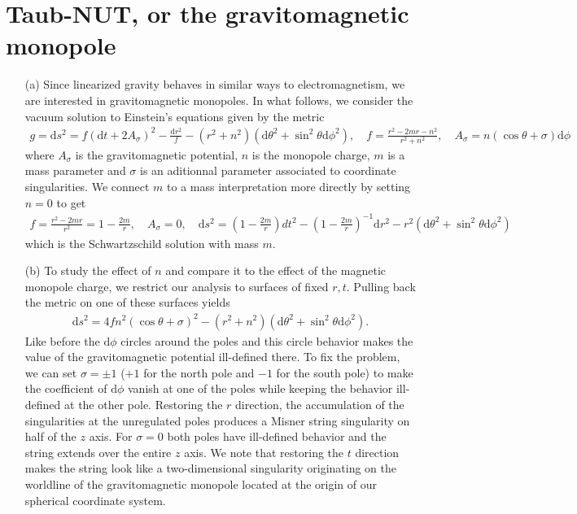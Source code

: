 \documentclass[10pt, a4paper]{article}
\begin{document}
{\section{Taub-NUT, or the gravitomagnetic monopole}
\begin{enumerate}
  \item[(a)] Since linearized gravity behaves in similar ways to electromagnetism, we are interested in gravitomagnetic monopoles. In what follows, we consider the vacuum solution to Einstein's equations given by the metric
  \begin{align*}
    g = \text{d} s^2=f\left(\text{d} t+2 A_\sigma\right)^2-\frac{\text{d} r^2}{f}-\left(r^2+n^2\right)\left(\text{d} \theta^2+\sin ^2 \theta \text{d} \phi^2\right), \quad f=\frac{r^2-2 m r-n^2}{r^2+n^2}, \quad A_\sigma=n(\cos \theta+\sigma) \text{d} \phi
  \end{align*}
  where $A_{\sigma}$ is the gravitomagnetic potential, $n$ is the monopole charge, $m$ is a mass parameter and $\sigma$ is an aditionnal parameter associated to coordinate singularities. We connect $m$ to a mass interpretation more directly by setting $n=0$ to get 
  \begin{align*}
    f=\frac{r^2-2 m r}{r^2} = 1-\frac{2m}{r}, \quad A_\sigma=0, \quad \text{d} s^2= \left(1-\frac{2m}{r}\right) d t^2-\left(1-\frac{2m}{r}\right)^{-1}\text{d} r^2 - r^2\left(\text{d} \theta^2+\sin ^2 \theta \text{d} \phi^2\right)
  \end{align*}
  which is the Schwartzschild solution with mass $m$.
  \item[(b)] To study the effect of $n$ and compare it to the effect of the magnetic monopole charge, we restrict our analysis to surfaces of fixed $r, t$. Pulling back the metric on one of these surfaces yields 
  \begin{align*}
    \text{d} s^2=4 f n^2 (\cos \theta+\sigma)^2-\left(r^2+n^2\right)\left(\text{d} \theta^2+\sin ^2 \theta \text{d} \phi^2\right).
  \end{align*}
  Like before the $\text{d}\phi$ circles around the poles and this circle behavior makes the value of the gravitomagnetic potential ill-defined there. To fix the problem, we can set $\sigma = \pm 1$ ($+1$ for the north pole and $-1$ for the south pole) to make the coefficient of $\text{d}\phi$ vanish at one of the poles while keeping the behavior ill-defined at the other pole. Restoring the $r$ direction, the accumulation of the singularities at the unregulated poles produces a Misner string singularity on half of the $z$ axis. For $\sigma = 0$ both poles have ill-defined behavior and the string extends over the entire $z$ axis. We note that restoring the $t$ direction makes the string look like a two-dimensional singularity originating on the worldline of the gravitomagnetic monopole located at the origin of our spherical coordinate system. 

\end{enumerate}}
\end{document}
